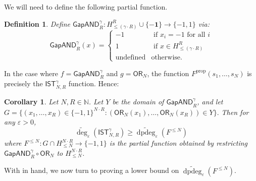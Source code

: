 \documentclass[11pt, letterpaper, fleqn]{article}
\newtheorem{definition}[theorem]{Definition}
\newtheorem{corollary}[theorem]{Corollary}
\theoremstyle{plain}
\newcommand{\SE}{\mathsf{ IST}}
\newcommand{\OR}{\mathsf{ OR}}
\newcommand{\bits}{\{-1,1\}}
\newcommand{\N}{\mathbb{N}}
\newcommand{\eps}{\varepsilon}
\newcommand{\adeg}{\widetilde{\operatorname{deg}}}
\newcommand{\dpdeg}{\widetilde{\operatorname{dpdeg}}}
\newcommand{\GAPAND}{\mathsf{GapAND}}
\begin{document}
We will need to define the following partial function.

\begin{definition}
Define $\GAPAND_{R}^{\gamma} \colon H_{\leq (\gamma \cdot R)}^R \cup \{\mathbf{-1}\} \to \bits$ via:
$$\GAPAND_{R}^{\gamma}(x) = \begin{cases} 
-1 & \text { if } x_i=-1 \text{ for all } i \\
1 & \text{ if } x\in H_{\leq (\gamma \cdot R)}^R\\
\text{undefined} & \text{otherwise}.
\end{cases}$$
\end{definition}

In the case where $f = \GAPAND_{R}^{\gamma}$ and $g = \OR_N$, the function $F^{\operatorname{prop}}(s_1, \dots, s_N)$ is precisely the $\SE_{N, R}^\gamma$ function. Hence:

\begin{corollary} \label{cor:se-reduction}
Let $N, R \in \N$. Let $Y$ be the domain of $\GAPAND_R^{\gamma}$,
and let $G=\{(x_1, \dots, x_R) \in \bits^{N \cdot R} \colon (\OR_N(x_1), \dots, \OR_N(x_R)) \in Y\}.$
Then for any $\eps > 0$,
\[\adeg_\eps(\SE_{N, R}^\gamma) \ge \dpdeg_\eps(F^{\le N})\]
where $F^{\le N} : G \cap H^{N\cdot R}_{\le N} \to \bits$ is the partial function
obtained by restricting $\GAPAND_{R}^{\gamma} \circ \OR_N$ to $H^{N\cdot R}_{\le N}$.
\end{corollary}

With  in hand, we now turn to proving 
a lower bound on $\dpdeg_{\eps}(F^{\le N})$.
\end{document}
